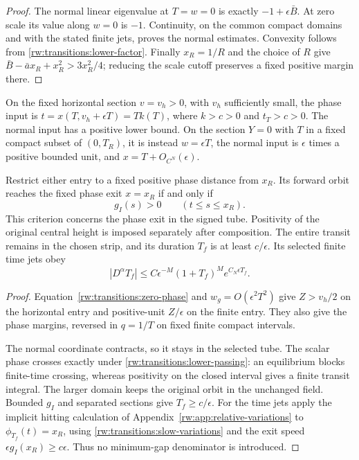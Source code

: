 \begin{proof}
The normal linear eigenvalue at $T=w=0$ is exactly
$-1+\epsilon\bar B$. At zero scale its value along $w=0$ is $-1$.
Continuity, on the common compact domains and with the stated finite
jets, proves the normal estimates. Convexity follows from
\eqref{rw:transitions:lower-factor}. Finally $x_R=1/R$ and the
choice of $R$ give
$\bar B-\bar ax_R+x_R^2>3x_R^2/4$; reducing the scale cutoff
preserves a fixed positive margin there.
\end{proof}

\begin{lemma}\label{rw:transitions:lower-sections}
On the fixed horizontal section $v=v_h>0$, with $v_h$ sufficiently
small, the phase input is
$t=x(T,v_h+\epsilon T)=T k(T)$, where $k>c>0$ and $t_T>c>0$.
The normal input has a positive lower bound. On the section $Y=0$
with $T$ in a fixed compact subset of $(0,T_R)$, it is instead
$w=\epsilon T$, the normal input is $\epsilon$ times a positive
bounded unit, and $x=T+O_{C^N}(\epsilon)$.

Restrict either entry to a fixed positive phase distance from $x_R$.
Its forward orbit reaches the fixed phase exit $x=x_R$ if and only if
\begin{equation}\label{rw:transitions:lower-passing}
g_I(s)>0\qquad(t\le s\le x_R).
\end{equation}
This criterion concerns the phase exit in the signed tube. Positivity
of the original central height is imposed separately after composition.
The entire transit remains in the chosen strip, and its duration
$T_f$ is at least $c/\epsilon$. Its selected finite time jets obey
\[
 |D^\alpha T_f|\le C\epsilon^{-M}(1+T_f)^M
                         e^{C_N\epsilon T_f}.
\]
\end{lemma}
\begin{proof}
Equation~\eqref{rw:transitions:zero-phase} and
$w_g=O(\epsilon^2T^2)$ give $Z>v_h/2$ on the horizontal entry and
positive-unit $Z/\epsilon$ on the finite entry. They also give the
phase margins, reversed in $q=1/T$ on fixed finite compact intervals.

The normal coordinate contracts, so it stays in the selected tube.
The scalar phase crosses exactly under \eqref{rw:transitions:lower-passing}:
an equilibrium blocks finite-time crossing, whereas positivity on the
closed interval gives a finite transit integral. The larger domain keeps
the original orbit in the unchanged field. Bounded $g_I$ and separated
sections give $T_f\ge c/\epsilon$. For the time jets apply the implicit
hitting calculation of Appendix~\ref{rw:app:relative-variations} to
$\phi_{T_f}(t)=x_R$, using \eqref{rw:transitions:slow-variations} and
the exit speed $\epsilon g_I(x_R)\ge c\epsilon$. Thus no minimum-gap
denominator is introduced.
\end{proof}
